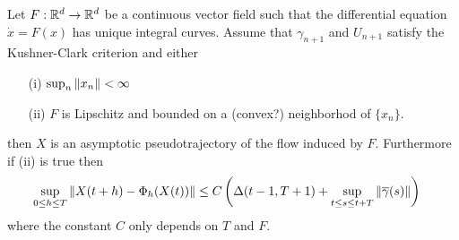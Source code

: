 \begin{prop}\label{KushnerClarkImpliesPseudotrajectory}Let $F : \mathbb{R}^d \to \mathbb{R}^d$ be a continuous vector field such that the differential equation $\dot{x} = F(x)$ has unique integral curves.  Assume that $\gamma_{n+1}$ and $U_{n+1}$ satisfy the Kushner-Clark criterion and either
\begin{itemize}
\item[(i)] $\sup_{n} \left \lVert x_n \right \rVert < \infty$ 
\item[(ii)] $F$ is Lipschitz and bounded on a (convex?) neighborhod of $\lbrace x_n \rbrace$.
\end{itemize}
then $X$ is an asymptotic pseudotrajectory of the flow induced by $F$.  Furthermore if (ii) is true then
\begin{align*}
\sup_{0 \leq h \leq T} \left \lVert X(t+h) - \Phi_h(X(t)) \right \rVert &\leq C \left( \Delta(t-1, T+1) + \sup_{t \leq s \leq t+T} \left \lVert \overline{\gamma}(s) \right \rVert \right)
\end{align*}
where the constant $C$ only depends on $T$ and $F$.
\end{prop}
